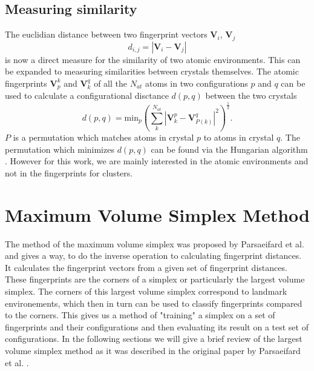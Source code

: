 \subsection{Measuring similarity}
The euclidian distance between two fingerprint vectors $\mathbf{V}_i$, $\mathbf{V}_j$ 
\begin{equation}\label{fp_dist}
d_{i,j}=|\mathbf{V}_i-\mathbf{V}_j|
\end{equation}
is now a direct measure for the similarity of two atomic environments. This can be expanded to measuring similarities between crystals themselves. The atomic fingerprints $\mathbf{V}_p^k$ and $\mathbf{V}_k^q$ of all the $N_{at}$ atoms in two configurations $p$ and $q$ can be used to calculate a configurational disctance $d(p,q)$ between the two crystals \cite{Zhu2016}
\begin{equation}d(p,q)=\text{min}_p\left(\sum_k^{N_{at}}|\mathbf{V}^p_k-\mathbf{V}^q_{P(k)}|^2\right)^{\frac{1}{2}}.\end{equation}
$P$ is a permutation which matches atoms in crystal $p$ to atoms in crystal $q$. The permutation which minimizes $d(p,q)$ can be found via the Hungarian algorithm \cite{Kuhn1955}. However for this work, we are mainly interested in the atomic environments and not in the fingerprints for clusters.

\section{Maximum Volume Simplex Method}
The method of the maximum volume simplex was proposed by Parsaeifard et al. \cite{Behnam2020} and gives a way, to do the inverse operation to calculating fingerprint distances. It calculates the fingerprint vectors from a given set of fingerprint distances. These fingerprints are the corners of a simplex or particularly the largest volume simplex. The corners of this largest volume simplex correspond to landmark environements, which then in turn can be used to classify fingerprints compared to the corners. This gives us a method of "training" a simplex on a set of fingerprints and their configurations and then evaluating its result on a test set of configurations. In the following sections we will give a brief review of the largest volume simplex method as it was described in the original paper by Parsaeifard et al. \cite{Behnam2020}.
